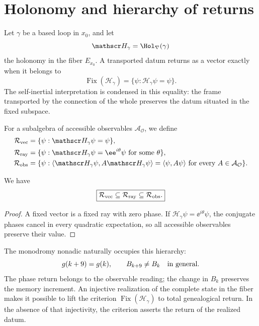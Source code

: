 \section{Holonomy and hierarchy of returns}

Let \(\gamma\) be a based loop in \(x_0\), and let
\begin{equation}
 \mathscr H_\gamma=\Hol_\nabla(\gamma)
 \label{eq:rm-obs-holonomy}
\end{equation}
the holonomy in the fiber \(E_{x_0}\). A transported datum returns as
a vector exactly when it belongs to
\begin{equation}
 \operatorname{Fix}(\mathscr H_\gamma)
 =\{\psi:\mathscr H_\gamma\psi=\psi\}.
 \label{eq:rm-obs-fix-holonomy}
\end{equation}
The self-inertial interpretation is condensed in this equality: the frame
transported by the connection of the whole preserves the datum situated in
the fixed subspace.

For a subalgebra of accessible observables
\(\mathcal A_{\mathcal O}\), we define
\begin{align}
 \mathcal R_{\rm vec}
 &=\{\psi:\mathscr H_\gamma\psi=\psi\},
 \label{eq:rm-obs-return-vector}\\
 \mathcal R_{\rm ray}
 &=\{\psi:\mathscr H_\gamma\psi=\ee^{i\theta}\psi
 \text{ for some }\theta\},
 \label{eq:rm-obs-return-ray}\\
 \mathcal R_{\rm obs}
 &=\{\psi:
 \langle\mathscr H_\gamma\psi,A\mathscr H_\gamma\psi\rangle
 =\langle\psi,A\psi\rangle
 \text{ for every }A\in\mathcal A_{\mathcal O}\}.
 \label{eq:rm-obs-return-observable}
\end{align}

\begin{proposition}
\label{prop:rm-obs-return-hierarchy}
We have
\begin{equation}
 \boxed{
 \mathcal R_{\rm vec}
 \subseteq\mathcal R_{\rm ray}
 \subseteq\mathcal R_{\rm obs}.}
 \label{eq:rm-obs-return-hierarchy}
\end{equation}
\end{proposition}

\begin{proof}
A fixed vector is a fixed ray with zero phase. If
\(\mathscr H_\gamma\psi=\ee^{i\theta}\psi\), the conjugate phases
cancel in every quadratic expectation, so all accessible observables
preserve their value.
\end{proof}

The monodromy nonadic naturally occupies this hierarchy:
\begin{equation}
 g(k+9)=g(k),
 \qquad
 B_{k+9}\neq B_k\quad\hbox{in general}.
 \label{eq:rm-obs-phase-state-return}
\end{equation}
The phase return belongs to the observable reading; the change in
\(B_k\) preserves the memory increment. An injective realization of the
complete state in the fiber makes it possible to lift the criterion
\(\operatorname{Fix}(\mathscr H_\gamma)\) to total genealogical return.
In the absence of that injectivity, the criterion asserts the return of the
realized datum.

